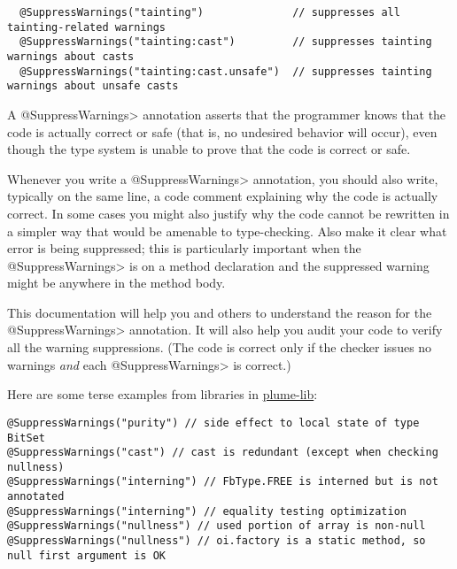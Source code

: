 \begin{Verbatim}
  @SuppressWarnings("tainting")              // suppresses all tainting-related warnings
  @SuppressWarnings("tainting:cast")         // suppresses tainting warnings about casts
  @SuppressWarnings("tainting:cast.unsafe")  // suppresses tainting warnings about unsafe casts
\end{Verbatim}



A \<@SuppressWarnings> annotation asserts that the programmer knows that
the code is actually correct or safe (that is, no undesired behavior will
occur), even though the type system is unable to prove that the code is
correct or safe.

Whenever you write a \<@SuppressWarnings> annotation, you should also
write, typically on the same line, a code comment
explaining why the code is actually correct.  In some cases you might also
justify why the code cannot be rewritten in a simpler way that would be
amenable to type-checking.  Also make it clear what error is being
suppressed; this is particularly important when the \<@SuppressWarnings> is
on a method declaration and the suppressed warning might be anywhere in the
method body.

This documentation will help you and others to understand the reason for
the \<@SuppressWarnings> annotation.  It will also help you audit your code
to verify all the warning suppressions.  (The code is correct only if the
checker issues no warnings \emph{and} each \<@SuppressWarnings> is correct.)

Here are some terse examples from libraries in \href{https://github.com/plume-lib/}{plume-lib}:

\begin{Verbatim}
@SuppressWarnings("purity") // side effect to local state of type BitSet
@SuppressWarnings("cast") // cast is redundant (except when checking nullness)
@SuppressWarnings("interning") // FbType.FREE is interned but is not annotated
@SuppressWarnings("interning") // equality testing optimization
@SuppressWarnings("nullness") // used portion of array is non-null
@SuppressWarnings("nullness") // oi.factory is a static method, so null first argument is OK
\end{Verbatim}




